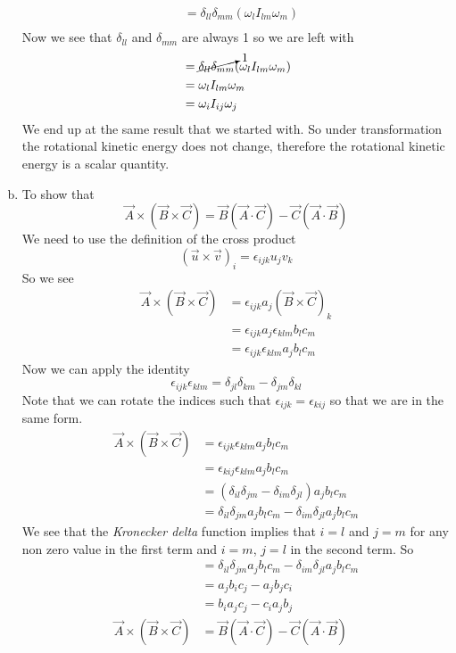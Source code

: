 \documentclass[11pt]{article}
\numberwithin{equation}{section}
\begin{document}
\begin{enumerate}[(a)]
\begin{align*}
&= \delta_{ll}\delta_{mm}(\omega_lI_{lm}\omega_m)\\
\end{align*}
Now we see that $\delta_{ll}$ and $\delta_{mm}$ are always 1 so we are left with
\begin{align*}
&= \cancelto{1}{\delta_{ll}\delta_{mm}}(\omega_lI_{lm}\omega_m)\\
&= \omega_lI_{lm}\omega_m\\
&= \omega_iI_{ij}\omega_j
\end{align*}
We end up at the same result that we started with. So under transformation the rotational kinetic energy does not change, therefore the rotational kinetic energy is a scalar quantity.
\item
To show that 
$$\vec{A}\times(\vec{B}\times \vec{C}) = \vec{B}(\vec{A}\cdot\vec{C})-\vec{C}(\vec{A}\cdot\vec{B})$$
We need to use the definition of the cross product 
$$(\vec{u}\times\vec{v})_i = \epsilon_{ijk}u_jv_k$$
So we see
\begin{align*}
\vec{A}\times(\vec{B}\times \vec{C}) &= \epsilon_{ijk}a_j(\vec{B}\times\vec{C})_k\\
&= \epsilon_{ijk}a_j\epsilon_{klm}b_lc_m\\
&= \epsilon_{ijk}\epsilon_{klm}a_jb_lc_m
\end{align*}
Now we can apply the identity 
$$\epsilon_{ijk}\epsilon_{klm} = \delta_{jl}\delta_{km} - \delta_{jm} \delta_{kl}$$
Note that we can rotate the indices such that $\epsilon_{ijk} = \epsilon_{kij}$ so that we are in the same form.
\begin{align*}
\vec{A}\times(\vec{B}\times \vec{C}) &= \epsilon_{ijk}\epsilon_{klm}a_jb_lc_m\\
&= \epsilon_{kij}\epsilon_{klm}a_jb_lc_m\\
&= (\delta_{il}\delta_{jm} - \delta_{im} \delta_{jl})a_jb_lc_m\\
&= \delta_{il}\delta_{jm}a_jb_lc_m - \delta_{im} \delta_{jl}a_jb_lc_m
\end{align*}
We see that the \emph{Kronecker delta} function implies that $i=l$ and $j=m$ for any non zero value in the first term and $i=m$, $j=l$ in the second term. So
\begin{align*}
&= \delta_{il}\delta_{jm}a_jb_lc_m - \delta_{im} \delta_{jl}a_jb_lc_m\\
&= a_jb_ic_j - a_jb_jc_i\\
&= b_ia_jc_j - c_ia_jb_j\\
\vec{A}\times(\vec{B}\times \vec{C}) &= \vec{B}(\vec{A}\cdot\vec{C})-\vec{C}(\vec{A}\cdot\vec{B})
\end{align*}


\end{enumerate}
\end{document}
